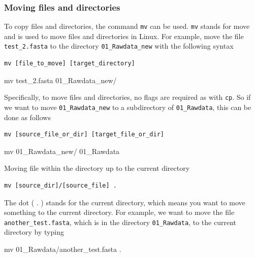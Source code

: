 \documentclass[
  letterpaper,
  DIV=11,
  numbers=noendperiod]{scrreprt}
\newenvironment{Shaded}{\begin{snugshade}}{\end{snugshade}}
\newcommand{\FunctionTok}[1]{\textcolor[rgb]{0.28,0.35,0.67}{#1}}
\newcommand{\NormalTok}[1]{\textcolor[rgb]{0.00,0.23,0.31}{#1}}
\begin{document}
\hypertarget{moving-files-and-directories}{%
\subsubsection*{Moving files and
directories}\label{moving-files-and-directories}}

To copy files and directories, the command \texttt{mv} can be used.
\texttt{mv} stands for move and is used to move files and directories in
Linux. For example, move the file \texttt{test\_2.fasta} to the
directory \texttt{01\_Rawdata\_new} with the following syntax

\begin{verbatim}
mv [file_to_move] [target_directory]
\end{verbatim}

\begin{Shaded}
\begin{Highlighting}[]
\FunctionTok{mv}\NormalTok{ test\_2.fasta 01\_Rawdata\_new/}
\end{Highlighting}
\end{Shaded}

Specifically, to move files and directories, no flags are required as
with \texttt{cp}. So if we want to move \texttt{01\_Rawdata\_new} to a
subdirectory of \texttt{01\_Rawdata}, this can be done as follows

\begin{verbatim}
mv [source_file_or_dir] [target_file_or_dir]
\end{verbatim}

\begin{Shaded}
\begin{Highlighting}[]
\FunctionTok{mv}\NormalTok{ 01\_Rawdata\_new/ 01\_Rawdata}
\end{Highlighting}
\end{Shaded}

Moving file within the directory up to the current directory

\begin{verbatim}
mv [source_dir]/[source_file] .
\end{verbatim}

The dot ( . ) stands for the current directory, which means you want to
move something to the current directory. For example, we want to move
the file \texttt{another\_test.fasta}, which is in the directory
\texttt{01\_Rawdata}, to the current directory by typing

\begin{Shaded}
\begin{Highlighting}[]
\FunctionTok{mv}\NormalTok{ 01\_Rawdata/another\_test.fasta .}
\end{Highlighting}
\end{Shaded}
\end{document}
